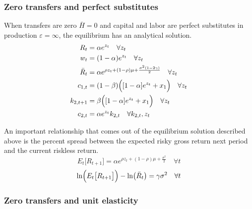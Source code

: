 \documentclass[letterpaper,12pt]{article}
\theoremstyle{definition}
\newcommand\ve{\varepsilon}
\begin{document}
    \subsubsection{Zero transfers and perfect substitutes}\label{SecTAppBlanchEqlb_inf}

      When transfers are zero $\bar{H}=0$ and capital and labor are perfect substitutes in production $\ve=\infty$, the equilibrium has an analytical solution.
      \begin{align}
        R_t &= \alpha e^{z_t} \quad\forall z_t \label{EqTAppBlanch_EqlRt_inf} \\
        w_t &= (1 - \alpha)e^{z_t} \quad\forall z_t \label{EqTAppBlahcn_Eqlwt_inf} \\
        \bar{R}_t &= \alpha e^{\rho z_t + (1-\rho)\mu + \frac{\sigma^2(1-2\gamma)}{2}} \quad\forall z_t \label{EqTAppBlahcn_EqlRbart_inf} \\
        c_{1,t} &= (1 - \beta)\Bigl([1 - \alpha]e^{z_t}+ x_1\Bigr) \quad\forall z_t \label{EqTAppBlahcn_Eqlc1t_inf} \\
        k_{2,t+1} &= \beta\Bigl([1 - \alpha]e^{z_t}+ x_1\Bigr) \quad\forall z_t \label{EqTAppBlahcn_Eqlk2tp1_inf} \\
        c_{2,t} &= \alpha e^{z_t}k_{2,t} \quad\forall k_{2,t}, z_t \label{EqTAppBlahcn_Eqlc2t_inf}
      \end{align}

      An important relationship that comes out of the equilibrium solution described above is the percent spread between the expected risky gross return next period and the current riskless return.
      \begin{equation}\label{EqTAppBlanch_ERtp1_inf}
        E_t\bigl[R_{t+1}\bigr] = \alpha e^{\rho z_t + (1-\rho)\mu + \frac{\sigma^2}{2}} \quad\forall t
      \end{equation}
      \begin{equation}\label{EqTAppBlanch_spread_inf}
        \ln\Bigl(E_t\bigl[R_{t+1}\bigr]\Bigr) - \ln\bigl(\bar{R}_t\bigr) = \gamma\sigma^2 \quad\forall t
      \end{equation}


    \subsubsection{Zero transfers and unit elasticity}\label{SecTAppBlanchEqlb_1}
\end{document}
